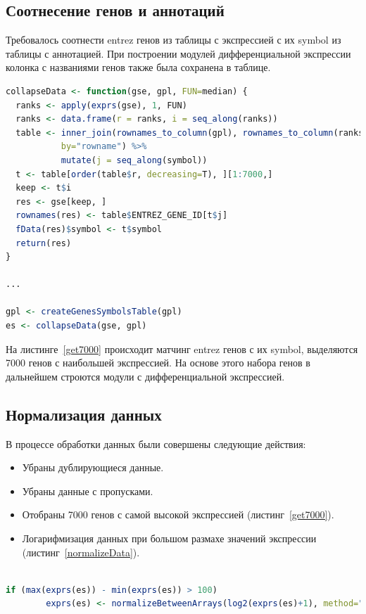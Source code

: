 \documentclass[times,specification,annotation]{itmo-student-thesis}
\begin{document}
\subsection{Соотнесение генов и аннотаций}
Требовалось соотнести entrez генов из таблицы с экспрессией с их symbol из таблицы с аннотацией. При построении модулей дифференциальной экспрессии колонка с названиями генов также была сохранена в таблице.

\begin{lstlisting}[float=!h, caption={Выделение 7000 генов с максимальной экспрессией.}, captionpos=b, label={get7000}, basicstyle=\footnotesize, language=R]
collapseData <- function(gse, gpl, FUN=median) {
  ranks <- apply(exprs(gse), 1, FUN)
  ranks <- data.frame(r = ranks, i = seq_along(ranks))
  table <- inner_join(rownames_to_column(gpl), rownames_to_column(ranks), 
           by="rowname") %>% 
           mutate(j = seq_along(symbol))
  t <- table[order(table$r, decreasing=T), ][1:7000,]
  keep <- t$i
  res <- gse[keep, ]
  rownames(res) <- table$ENTREZ_GENE_ID[t$j]
  fData(res)$symbol <- t$symbol
  return(res)
}

...

gpl <- createGenesSymbolsTable(gpl)
es <- collapseData(gse, gpl)

\end{lstlisting} 

На листинге~\ref{get7000} происходит матчинг entrez генов с их symbol, выделяются 7000 генов с наибольшей экспрессией. На основе этого набора генов в дальнейшем строются модули с дифференциальной экспрессией.    

\subsection{Нормализация данных}

В процессе обработки данных были совершены следующие действия:
\begin{itemize}
    \item Убраны дублирующиеся данные​.
    \item Убраны данные с пропусками​.
    \item Отобраны 7000 генов с самой высокой экспрессией​ (листинг~\ref{get7000}).
    \item Логарифмизация данных при большом размахе значений экспрессии (листинг~\ref{normalizeData}).
\end{itemize}

\begin{lstlisting}[float=!h, caption={Логарифмизация данных.}, captionpos=b, label={normalizeData}, basicstyle=\footnotesize, language=R]

if (max(exprs(es)) - min(exprs(es)) > 100)
        exprs(es) <- normalizeBetweenArrays(log2(exprs(es)+1), method="quantile")

\end{lstlisting} 
\end{document}
